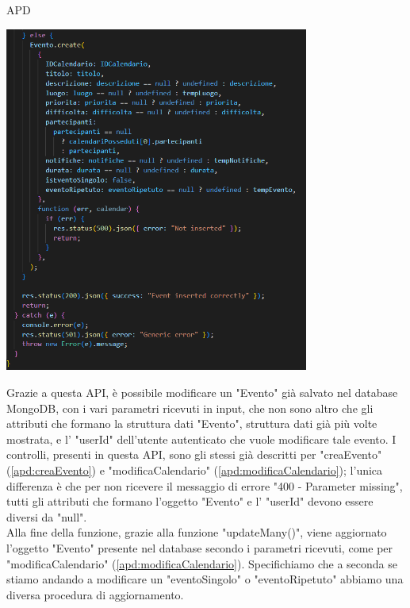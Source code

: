 \begin{listaPersonale} {APD}
\begin{listaPersonale2}[APD]{}
\begin{center}
                    \includegraphics[width=0.75\textwidth, height=0.6\textheight]{img/png/APIs/creaEvento3.png}
                \end{center}
                \newpage
                Grazie a questa API, è possibile modificare un "Evento" già salvato nel database MongoDB, con i vari parametri ricevuti in input, che non sono altro che gli attributi che formano la struttura dati "Evento", struttura dati già più volte mostrata, e l' "userId" dell'utente autenticato che vuole modificare tale evento. I controlli, presenti in questa API, sono gli stessi già descritti per "creaEvento" (\ref{apd:creaEvento}) e "modificaCalendario" (\ref{apd:modificaCalendario}); l'unica differenza è che per non ricevere il messaggio di errore "400 - Parameter missing", tutti gli attributi che formano l'oggetto "Evento" e l' "userId" devono essere diversi da "null". \\
                Alla fine della funzione, grazie alla funzione "updateMany()", viene aggiornato l'oggetto "Evento" presente nel database secondo i parametri ricevuti, come per "modificaCalendario" (\ref{apd:modificaCalendario}). Specifichiamo che a seconda se stiamo andando a modificare un "eventoSingolo" o "eventoRipetuto" abbiamo una diversa procedura di aggiornamento.

\end{listaPersonale2}
\end{listaPersonale}
